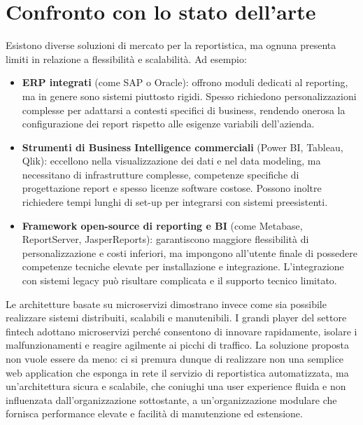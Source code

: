 \section{Confronto con lo stato dell’arte}
Esistono diverse soluzioni di mercato per la reportistica, ma ognuna presenta limiti in relazione a flessibilità e scalabilità. Ad esempio:

\begin{itemize}
    \item \textbf{ERP integrati} (come SAP o Oracle): offrono moduli dedicati al reporting, ma in genere sono sistemi piuttosto rigidi. Spesso richiedono personalizzazioni complesse per adattarsi a contesti specifici di business, rendendo onerosa la configurazione dei report rispetto alle esigenze variabili dell’azienda.
    \item \textbf{Strumenti di Business Intelligence commerciali} (Power BI, Tableau, Qlik): eccellono nella visualizzazione dei dati e nel data modeling, ma necessitano di infrastrutture complesse, competenze specifiche di progettazione report e spesso licenze software costose. Possono inoltre richiedere tempi
    lunghi di set-up per integrarsi con sistemi preesistenti.
    \item \textbf{Framework open-source di reporting e BI} (come Metabase, ReportServer, JasperReports): garantiscono maggiore flessibilità di personalizzazione e costi inferiori, ma impongono all’utente finale di possedere competenze tecniche elevate per installazione e integrazione. L’integrazione con sistemi legacy può risultare complicata e il supporto tecnico limitato.
\end{itemize}

Le architetture basate su microservizi dimostrano invece come sia possibile realizzare sistemi distribuiti, scalabili e manutenibili. I grandi player del settore fintech adottano microservizi perché consentono di innovare rapidamente, isolare i malfunzionamenti e reagire agilmente ai picchi di traffico. La soluzione proposta non vuole essere da meno: ci si premura dunque di realizzare non una semplice web application che esponga in rete il servizio di reportistica automatizzata, ma un'architettura sicura e scalabile, che coniughi una user experience fluida e non influenzata dall'organizzazione sottostante, a un'organizzazione modulare che fornisca performance elevate e facilità di manutenzione ed estensione.


